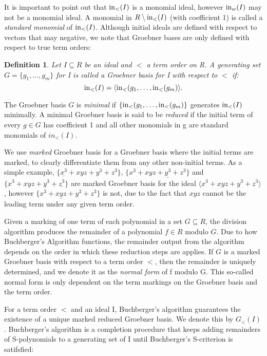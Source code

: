 \documentclass[12pt,a4paper]{report}
\newtheorem{definition}{Definition}
\begin{document}
It is important to point out that $\operatorname{in}_{<} (I)$ is a monomial ideal, however $\operatorname{in}_{w} (I)$ may not be a monomial ideal. A monomial in $R \setminus \operatorname{in}_{<} (I)$ (with coefficient 1) is called a \emph{standard monomial} of $\operatorname{in}_{<} (I)$. Although initial ideals are defined with respect to vectors that may negative, we note that Groebner bases are only defined with respect to true term orders:

\begin{definition}
Let $I \subseteq R$ be an ideal and $<$ a term order on R. A generating set $G = \{g_{1}, \ldots ,g_{m} \}$ for I is called a \emph{Groebner basis} for I with respect to $<$ if: 
\begin{equation*}
    \operatorname{in}_{<} (I) = \langle \operatorname{in}_{<} (g_{1}, \ldots , \operatorname{in}_{<} (g_{m}) \rangle.
\end{equation*}
\end{definition}

The Groebner basis $G$ is \emph{minimal} if $\{ \operatorname{in}_{<} (g_{1}, \ldots , \operatorname{in}_{<} (g_{m}) \}$ generates $\operatorname{in}_{<} (I)$ minimally.
A minimal Groebner basis is said to be \emph{reduced} if the initial term of every $g \in G$ has coefficient 1 and all other monomials in g are standard monomials of $in_{<} (I)$.


We use  \emph{marked} Groebner basis for a Groebner basis where the initial terms are marked, to clearly differentiate them from any other non-initial terms. As a simple example, $\{ \underline{x^3} + xyz + y^3 + z^3 \}$, $\{ x^3 + xyz + \underline{y^3} + z^3 \}$ and $\{ x^3 + xyz + y^3 + \underline{z^3} \}$ are marked Groebner basis for the ideal $\langle x^3 + xyz + y^3 + z^3 \rangle$, however $\{ x^3 + \underline{xyz} + y^3 + z^3 \}$ is not, due to the fact that $xyz$ cannot be the leading term under any given term order.

Given a marking of one term of each polynomial in a set $G \subseteq R$, the division algorithm produces the remainder of a polynomial $f \in R$ modulo $G$. Due to how Buchberger's Algorithm functions, the remainder output from the algorithm depends on the order in which these reduction steps are applies. If $G$ is a marked Groebner basis with respect to a term order $<$, then the remainder is uniquely determined, and we denote it as the \emph{normal form} of f modulo G. This so-called normal form is only dependent on the term markings on the Groebner basis and the term order.

For a term order $<$ and an ideal I, Buchberger's algorithm guarantees the existence of a unique marked reduced Groebner basis. We denote this by $G_{<} (I)$. Buchberger's algorithm is a completion procedure that keeps adding remainders of S-polynomials to a generating set of I until Buchberger's S-criterion is satifsfied:
\end{document}
